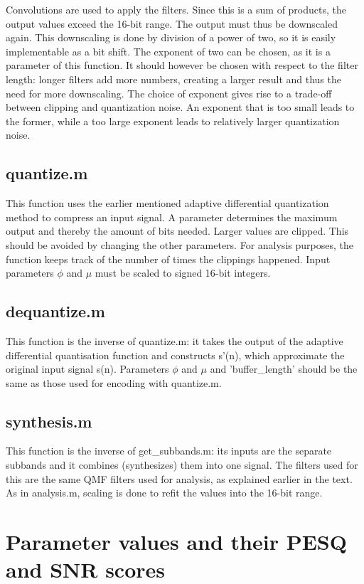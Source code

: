 \documentclass[a4paper]{article}
\begin{document}
Convolutions are used to apply the filters. Since this is a sum of products, the output values exceed the 16-bit range. The output must thus be downscaled again. This downscaling is done by division of a power of two, so it is easily implementable as a bit shift. The exponent of two can be chosen, as it is a parameter of this function. It should however be chosen with respect to the filter length: longer filters add more numbers, creating a larger result and thus the need for more downscaling. The choice of exponent gives rise to a trade-off between clipping and quantization noise. An exponent that is too small leads to the former, while a too large exponent leads to relatively larger quantization noise.

\subsection{quantize.m}
This function uses the earlier mentioned adaptive differential quantization method to compress an input signal. A parameter determines the maximum output and thereby the amount of bits needed. Larger values are clipped. This should be avoided by changing the other parameters. For analysis purposes, the function keeps track of the number of times the clippings happened. Input parameters $\phi$ and $\mu$ must be scaled to signed 16-bit integers.

\subsection{dequantize.m}
This function is the inverse of quantize.m: it takes the output of the adaptive differential quantisation function and constructs s'(n), which approximate the original input signal s(n). Parameters $\phi$ and $\mu$ and 'buffer\_length' should be the same as those used for encoding with quantize.m.


\subsection{synthesis.m}
This function is the inverse of get\_subbands.m: its inputs are the separate subbands and it combines (synthesizes) them into one signal. The filters used for this are the same QMF filters used for analysis, as explained earlier in the text. As in analysis.m, scaling is done to refit the values into the 16-bit range.

\section{Parameter values and their PESQ and SNR scores}
\end{document}
